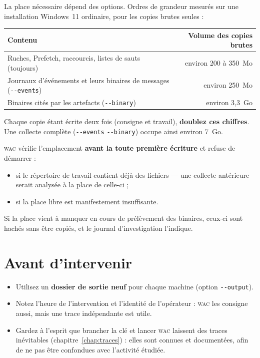 \documentclass[11pt,a4paper,oneside]{report}
\newcommand{\wac}{\textsc{wac}}
\newcommand{\opt}[1]{\texttt{-{}-#1}}
\begin{document}
La place nécessaire dépend des options. Ordres de grandeur mesurés sur une
installation Windows~11 ordinaire, pour les copies brutes seules :

\begin{center}
\begin{tabular}{@{}L{9.6cm}r@{}}
\toprule
Contenu & Volume des copies brutes \\
\midrule
Ruches, Prefetch, raccourcis, listes de sauts (toujours) & environ 200 à 350~Mo \\
Journaux d'événements et leurs binaires de messages (\opt{events}) & environ 250~Mo \\
Binaires cités par les artefacts (\opt{binary}) & environ 3,3~Go \\
\bottomrule
\end{tabular}
\end{center}

Chaque copie étant écrite deux fois (consigne et travail), \textbf{doublez ces
chiffres}. Une collecte complète (\opt{events} \opt{binary}) occupe ainsi environ
7~Go.

\wac{} vérifie l'emplacement \textbf{avant la toute première écriture} et refuse
de démarrer :
\begin{itemize}
  \item si le répertoire de travail contient déjà des fichiers — une collecte
        antérieure serait analysée à la place de celle-ci ;
  \item si la place libre est manifestement insuffisante.
\end{itemize}
Si la place vient à manquer en cours de prélèvement des binaires, ceux-ci sont
hachés sans être copiés, et le journal d'investigation l'indique.

\section{Avant d'intervenir}

\begin{itemize}
  \item Utilisez un \textbf{dossier de sortie neuf} pour chaque machine
        (option \opt{output}).
  \item Notez l'heure de l'intervention et l'identité de l'opérateur : \wac{} les
        consigne aussi, mais une trace indépendante est utile.
  \item Gardez à l'esprit que brancher la clé et lancer \wac{} laissent des traces
        inévitables (chapitre~\ref{chap:traces}) : elles sont connues et
        documentées, afin de ne pas être confondues avec l'activité étudiée.
\end{itemize}
\end{document}
